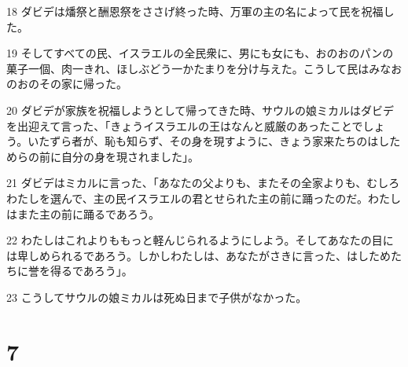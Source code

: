 \par 18 ダビデは燔祭と酬恩祭をささげ終った時、万軍の主の名によって民を祝福した。
\par 19 そしてすべての民、イスラエルの全民衆に、男にも女にも、おのおのパンの菓子一個、肉一きれ、ほしぶどう一かたまりを分け与えた。こうして民はみなおのおのその家に帰った。
\par 20 ダビデが家族を祝福しようとして帰ってきた時、サウルの娘ミカルはダビデを出迎えて言った、「きょうイスラエルの王はなんと威厳のあったことでしょう。いたずら者が、恥も知らず、その身を現すように、きょう家来たちのはしためらの前に自分の身を現されました」。
\par 21 ダビデはミカルに言った、「あなたの父よりも、またその全家よりも、むしろわたしを選んで、主の民イスラエルの君とせられた主の前に踊ったのだ。わたしはまた主の前に踊るであろう。
\par 22 わたしはこれよりももっと軽んじられるようにしよう。そしてあなたの目には卑しめられるであろう。しかしわたしは、あなたがさきに言った、はしためたちに誉を得るであろう」。
\par 23 こうしてサウルの娘ミカルは死ぬ日まで子供がなかった。

\chapter{7}

